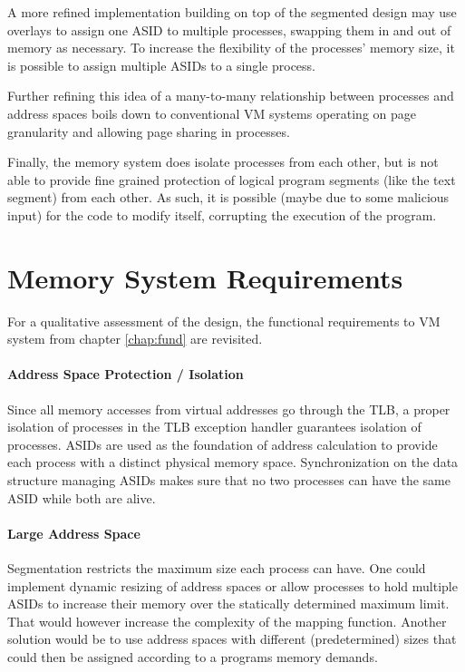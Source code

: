 A more refined implementation building on top of the segmented design may use overlays \cite{tanenbaumOS} to assign one ASID to multiple processes, swapping them in and out of memory as necessary. To increase the flexibility of the processes' memory size, it is possible to assign multiple ASIDs to a single process.

Further refining this idea of a many-to-many relationship between processes and address spaces boils down to conventional VM systems operating on page granularity and allowing page sharing in processes.

Finally, the memory system does isolate processes from each other, but is not able to provide fine grained protection of logical program segments (like the text segment) from each other. As such, it is possible (maybe due to some malicious input) for the code to modify itself, corrupting the execution of the program.

\section{Memory System Requirements}
For a qualitative assessment of the design, the functional requirements to VM system from chapter \ref{chap:fund} are revisited.

\paragraph{Address Space Protection / Isolation} Since all memory accesses from virtual addresses go through the TLB, a proper isolation of processes in the TLB exception handler guarantees isolation of processes. ASIDs are used as the foundation of address calculation to provide each process with a distinct physical memory space.
Synchronization on the data structure managing ASIDs makes sure that no two processes can have the same ASID while both are alive.

\paragraph{Large Address Space} Segmentation restricts the maximum size each process can have. One could implement dynamic resizing of address spaces or allow processes to hold multiple ASIDs to increase their memory over the statically determined maximum limit.
That would however increase the complexity of the mapping function. Another solution would be to use address spaces with different (predetermined) sizes that could then be assigned according to a programs memory demands.


